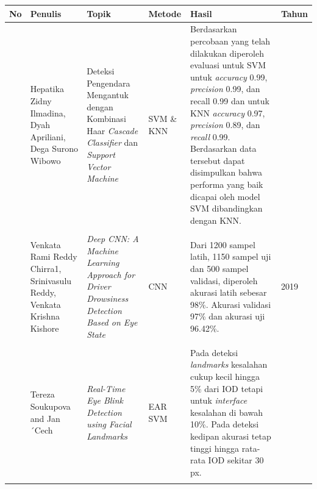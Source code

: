          \begin{table}[H]
        \centering
        \begin{tabular}%
        {>{\raggedright\arraybackslash}p{0.3cm} 
        >{\raggedright\arraybackslash}p{2.0cm} 
        >{\raggedright\arraybackslash}p{2.5cm} 
        >{\raggedright\arraybackslash}p{1.5cm} 
        >{\raggedright\arraybackslash}p{4.0cm} 
        >{\raggedright\arraybackslash}p{0.9cm}}
    
            \hline
            \textbf{No} & \textbf{Penulis} & \textbf{Topik} &\textbf{ Metode} & \textbf{Hasil} & \textbf{Tahun} \\    
            \hline

            3 
            & 
            Hepatika Zidny Ilmadina, Dyah Apriliani, Dega Surono Wibowo
            &
            Deteksi Pengendara Mengantuk dengan Kombinasi Haar 
                \textit{Cascade Classifier} dan \textit{Support Vector Machine}
            &
            SVM \& KNN
            &
            Berdasarkan percobaan yang telah dilakukan diperoleh evaluasi untuk SVM untuk \textit{accuracy} 0.99, \textit{precision} 0.99, dan recall 0.99 dan untuk KNN \textit{accuracy} 0.97, \textit{precision} 0.89, dan \textit{recall} 0.99. Berdasarkan data tersebut dapat disimpulkan bahwa performa yang baik dicapai oleh model SVM dibandingkan dengan KNN.
            &
            2020 \\
            \\
        
                4
            &
            Venkata Rami Reddy Chirra1, Srinivasulu Reddy, Venkata Krishna Kishore
            &
            \textit{Deep CNN: A Machine Learning Approach for Driver Drowsiness Detection Based on Eye State}
            &
            CNN
            &
            Dari 1200 sampel latih, 1150 sampel uji dan 500 sampel validasi, diperoleh  akurasi latih sebesar 98\%. Akurasi validasi 97\% dan akurasi uji 96.42\%.

            &

            2019 \\
            \\

             5
            & 
            Tereza Soukupova and Jan ´Cech &
           \textit{ Real-Time Eye Blink Detection using Facial Landmarks} &
            EAR SVM &

           Pada deteksi \textit{landmarks} kesalahan cukup kecil hingga 5\% dari IOD tetapi untuk \textit{interface} kesalahan di bawah 10\%. Pada deteksi kedipan akurasi tetap tinggi hingga rata-rata IOD sekitar 30 px.
             &
            2017\\
            \\

             \hline

        \end{tabular}
    \end{table}



